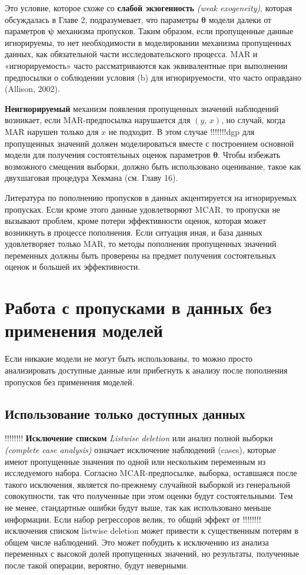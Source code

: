 Это условие, которое схоже со {\bf слабой экзогенность} \emph{(weak exogeneity)}, которая обсуждалась в Главе 2, подразумевает, что параметры $\mathbf{\theta}$ модели далеки от параметров $\mathbf{\psi}$ механизма пропусков. Таким образом, если пропущенные данные игнорируемы, то нет необходимости в моделировании механизма пропущенных данных, как обязательной части исследовательского процесса. MAR и «игнорируемость» часто рассматриваются как эквивалентные при выполнении предпосылки о соблюдении условия (b) для игнорируемости, что часто оправдано (Allison, 2002).

{\bf Неигнорируемый} механизм появления пропущенных значений наблюдений возникает, если MAR-предпосылка нарушается для $(y, \, x)$, но случай, когда MAR нарушен только для $x$ не подходит. В этом случае !!!!!!!dgp для пропущенных значений должен моделироваться вместе с построением основной модели для получения состоятельных оценок параметров $\mathbf{\theta}$. Чтобы избежать возможного смещения выборки, должно быть использовано оценивание, такое как двухшаговая процедура Хекмана (см. Главу 16).

Литература по пополнению пропусков в данных акцентируется на игнорируемых пропусках. Если кроме этого данные удовлетворяют MCAR, то пропуски не вызывают проблем, кроме потери эффективности оценок, которая может возникнуть в процессе пополнения. Если ситуация иная, и база данных удовлетворяет только MAR, то методы пополнения пропущенных значений переменных должны быть проверены на предмет получения состоятельных оценок и большей их эффективности.

\section{Работа с пропусками в данных без применения моделей} 

Если никакие модели не могут быть использованы, то можно просто анализировать доступные данные или прибегнуть к анализу после пополнения пропусков без применения моделей.

\subsection{Использование только доступных данных}
!!!!!!!! {\bf Исключение списком} \emph{Listwise deletion} или анализ полной выборки \emph{(complete case analysis)} означает исключение наблюдений (cases), которые имеют пропущенные значения по одной или нескольким переменным из исследуемого набора. Согласно MCAR-предпосылке, выборка, оставшаяся после такого исключения, является по-прежнему случайной выборкой из генеральной совокупности, так что полученные при этом оценки будут состоятельными. Тем не менее, стандартные ошибки будут выше, так как использовано меньше информации. Если набор регрессоров велик, то общий эффект от !!!!!!!! исключения списком listwise deletion может привести к существенным потерям в общем числе наблюдений. Это может побудить к исключению из анализа переменных с высокой долей пропущенных значений, но результаты, полученные после такой операции, вероятно, будут неверными. 

